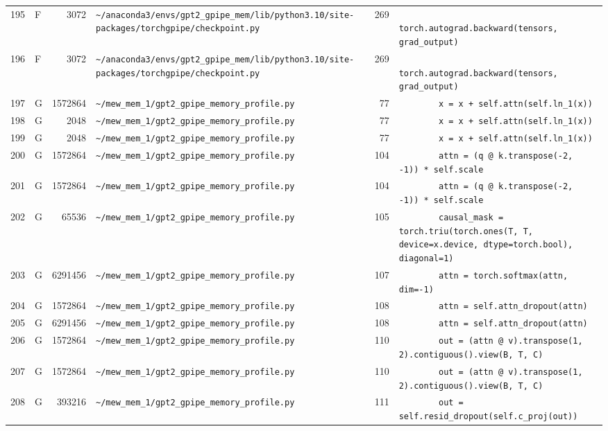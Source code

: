 \documentclass{article}
\begin{document}
\begin{longtable}{r l r p{6.5cm} r p{7.0cm}}
195 & F & 3072 & \lstinline|~/anaconda3/envs/gpt2_gpipe_mem/lib/python3.10/site-packages/torchgpipe/checkpoint.py| & 269 & \lstinline|            torch.autograd.backward(tensors, grad_output)| \\
196 & F & 3072 & \lstinline|~/anaconda3/envs/gpt2_gpipe_mem/lib/python3.10/site-packages/torchgpipe/checkpoint.py| & 269 & \lstinline|            torch.autograd.backward(tensors, grad_output)| \\
197 & G & 1572864 & \lstinline|~/mew_mem_1/gpt2_gpipe_memory_profile.py| & 77 & \lstinline|        x = x + self.attn(self.ln_1(x))| \\
198 & G & 2048 & \lstinline|~/mew_mem_1/gpt2_gpipe_memory_profile.py| & 77 & \lstinline|        x = x + self.attn(self.ln_1(x))| \\
199 & G & 2048 & \lstinline|~/mew_mem_1/gpt2_gpipe_memory_profile.py| & 77 & \lstinline|        x = x + self.attn(self.ln_1(x))| \\
200 & G & 1572864 & \lstinline|~/mew_mem_1/gpt2_gpipe_memory_profile.py| & 104 & \lstinline|        attn = (q @ k.transpose(-2, -1)) * self.scale| \\
201 & G & 1572864 & \lstinline|~/mew_mem_1/gpt2_gpipe_memory_profile.py| & 104 & \lstinline|        attn = (q @ k.transpose(-2, -1)) * self.scale| \\
202 & G & 65536 & \lstinline|~/mew_mem_1/gpt2_gpipe_memory_profile.py| & 105 & \lstinline|        causal_mask = torch.triu(torch.ones(T, T, device=x.device, dtype=torch.bool), diagonal=1)| \\
203 & G & 6291456 & \lstinline|~/mew_mem_1/gpt2_gpipe_memory_profile.py| & 107 & \lstinline|        attn = torch.softmax(attn, dim=-1)| \\
204 & G & 1572864 & \lstinline|~/mew_mem_1/gpt2_gpipe_memory_profile.py| & 108 & \lstinline|        attn = self.attn_dropout(attn)| \\
205 & G & 6291456 & \lstinline|~/mew_mem_1/gpt2_gpipe_memory_profile.py| & 108 & \lstinline|        attn = self.attn_dropout(attn)| \\
206 & G & 1572864 & \lstinline|~/mew_mem_1/gpt2_gpipe_memory_profile.py| & 110 & \lstinline|        out = (attn @ v).transpose(1, 2).contiguous().view(B, T, C)| \\
207 & G & 1572864 & \lstinline|~/mew_mem_1/gpt2_gpipe_memory_profile.py| & 110 & \lstinline|        out = (attn @ v).transpose(1, 2).contiguous().view(B, T, C)| \\
208 & G & 393216 & \lstinline|~/mew_mem_1/gpt2_gpipe_memory_profile.py| & 111 & \lstinline|        out = self.resid_dropout(self.c_proj(out))| \\

\end{longtable}
\end{document}
